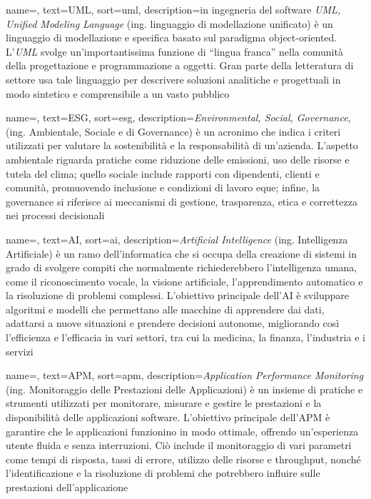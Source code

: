  {
    name=,
    text=UML,
    sort=uml,
    description={in ingegneria del software \emph{UML, Unified Modeling Language} (ing. linguaggio di modellazione unificato) è un linguaggio di modellazione e specifica basato sul paradigma object-oriented. L'\emph{UML} svolge un'importantissima funzione di ``lingua franca'' nella comunità della progettazione e programmazione a oggetti. Gran parte della letteratura di settore usa tale linguaggio per descrivere soluzioni analitiche e progettuali in modo sintetico e comprensibile a un vasto pubblico}
}

 {
    name=,
    text=ESG,
    sort=esg,
    description={\emph{Environmental, Social, Governance}, (ing. Ambientale, Sociale e di Governance) è un acronimo che indica i criteri utilizzati per valutare la sostenibilità e la responsabilità di un'azienda. L'aspetto ambientale riguarda pratiche come riduzione delle emissioni, uso delle risorse e tutela del clima; quello sociale include rapporti con dipendenti, clienti e comunità, promuovendo inclusione e condizioni di lavoro eque; infine, la governance si riferisce ai meccanismi di gestione, trasparenza, etica e correttezza nei processi decisionali}
}

 {
    name=,
    text=AI,
    sort=ai,
    description={\emph{Artificial Intelligence} (ing. Intelligenza Artificiale) è un ramo dell'informatica che si occupa della creazione di sistemi in grado di svolgere compiti che normalmente richiederebbero l'intelligenza umana, come il riconoscimento vocale, la visione artificiale, l'apprendimento automatico e la risoluzione di problemi complessi. L'obiettivo principale dell'AI è sviluppare algoritmi e modelli che permettano alle macchine di apprendere dai dati, adattarsi a nuove situazioni e prendere decisioni autonome, migliorando così l'efficienza e l'efficacia in vari settori, tra cui la medicina, la finanza, l'industria e i servizi}
}

 {
    name=,
    text=APM,
    sort=apm,
    description={\emph{Application Performance Monitoring} (ing. Monitoraggio delle Prestazioni delle Applicazioni) è un insieme di pratiche e strumenti utilizzati per monitorare, misurare e gestire le prestazioni e la disponibilità delle applicazioni software. L'obiettivo principale dell'APM è garantire che le applicazioni funzionino in modo ottimale, offrendo un'esperienza utente fluida e senza interruzioni. Ciò include il monitoraggio di vari parametri come tempi di risposta, tassi di errore, utilizzo delle risorse e throughput, nonché l'identificazione e la risoluzione di problemi che potrebbero influire sulle prestazioni dell'applicazione}
}

